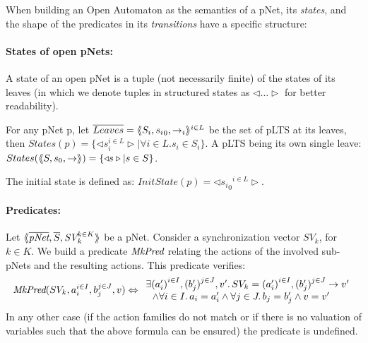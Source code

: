 \documentclass{lncs/llncs}
\newcommand{\TODO}[1]{\textcolor{red}{\textbf{[TODO:#1]}}}
\newcommand{\MkPred}{\symb{MkPred}}
\begin{document}
%

When building an Open Automaton as the semantics of a pNet, its
\emph{states}, and the shape of the predicates in its
\emph{transitions} have a specific structure:

\paragraph{States of open pNets:}\label{def-states}
  A state of an open pNet is a tuple (not necessarily finite) of the
  states of its leaves (in which we denote tuples
  in structured states as $\triangleleft\ldots\triangleright$ for better readability).

  For any pNet p, let $\overline{Leaves} = \langle\hspace{-0.58ex}\langle S_i,{s_i}_0, \to_i\rangle\hspace{-0.58ex}\rangle^{i \in L}$ be the set of pLTS at its leaves,
  then $States(p) = \{\triangleleft s_i^{i\in L}
  \triangleright| \forall i\in L. s_i \in S_i\}$.
A pLTS being its own single leave:
  $States(\langle\hspace{-0.58ex}\langle S,s_0, \to\rangle\hspace{-0.58ex}\rangle) = \{\triangleleft s \triangleright| s \in S\}$.

The initial state is defined as:
$InitState(p) = \triangleleft {{s_i}_0}^{i\in L}  \triangleright$.



\paragraph{Predicates:}
Let
$\mylangle\overline{\pNet},\overline{S},\symb{SV}_k^{k\in K} \myrangle$
be a pNet. Consider a synchronization vector $SV_k$, for $k\in K$. We build a
predicate $\MkPred$ relating
the actions of the involved sub-pNets and the resulting actions. This predicate verifies:
\[\MkPred(SV_k, a_i^{i\in I}, b_j^{j\in J}, v)\Leftrightarrow
\begin{array}{l}
\exists {(a'_i)}^{i\in I},
{(b'_j)}^{j\in J},v'.\, SV_k={(a'_i)}^{i\in I}, {(b'_j)}^{j\in J}\rightarrow v'
\\~~\land
\forall i\in I.\, a_i=a'_i\land \forall j \in J.\, b_j=b'_j \land v=v'
\end{array}\]
In any other case (if the action families do not match or if there is no valuation of
variables such that the above formula can be ensured) the predicate is undefined.
\end{document}
